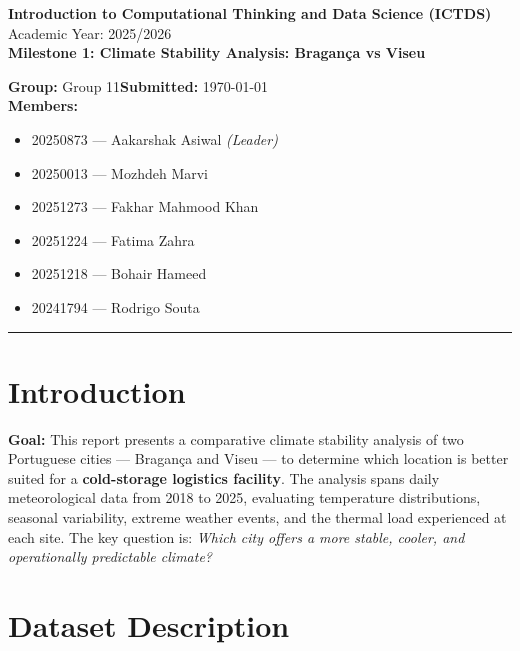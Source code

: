 \documentclass[11pt,a4paper]{article}
\newcommand{\CourseName}{Introduction to Computational Thinking and Data Science (ICTDS)}
\newcommand{\AcademicYear}{2025/2026}
\newcommand{\LabNumber}{Milestone 1}
\newcommand{\LabTitle}{Climate Stability Analysis: Bragança vs Viseu}
\newcommand{\GroupID}{Group 11}
\newcommand{\DateSubmitted}{\today}
\begin{document}
\begin{center}
  {\Large \textbf{\CourseName}}\\
  {\small Academic Year: \AcademicYear}\\[0.2cm]
  {\Large \textbf{\LabNumber: \LabTitle}}\\[0.3cm]
\end{center}

\noindent
\textbf{Group:} \GroupID \hfill \textbf{Submitted:} \DateSubmitted\\[0.2cm]
\noindent
\textbf{Members:}
\begin{itemize}
  \item 20250873 — Aakarshak Asiwal \textit{(Leader)}
  \item 20250013 — Mozhdeh Marvi
  \item 20251273 — Fakhar Mahmood Khan
  \item 20251224 — Fatima Zahra
  \item 20251218 — Bohair Hameed
  \item 20241794 — Rodrigo Souta
\end{itemize}
\rule{\textwidth}{0.4pt}

\section{Introduction}

\textbf{Goal:} This report presents a comparative climate stability analysis of two Portuguese cities — Bragança and Viseu — to determine which location is better suited for a \textbf{cold-storage logistics facility}. The analysis spans daily meteorological data from 2018 to 2025, evaluating temperature distributions, seasonal variability, extreme weather events, and the thermal load experienced at each site. The key question is: \textit{Which city offers a more stable, cooler, and operationally predictable climate?}



\section{Dataset Description}


\end{document}

